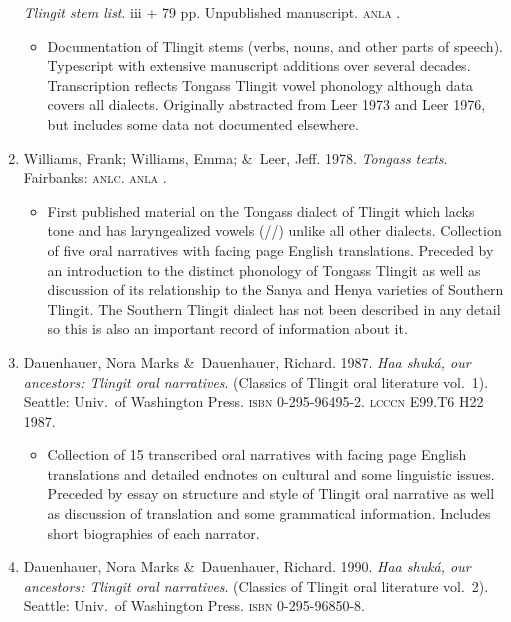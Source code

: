 \documentclass[12pt,letterpaper,oneside,article]{memoir}
\begin{document}
\begin{enumerate}
	\textit{Tlingit stem list}.
	iii + 79 pp.
	Unpublished manuscript.
	\textsc{anla} .
	\begin{itemize}
	\item	Documentation of Tlingit stems (verbs, nouns, and other parts of speech).
		Typescript with extensive manuscript additions over several decades.
		Transcription reflects Tongass Tlingit vowel phonology although data covers
		all dialects.
		Originally abstracted from Leer 1973 and Leer 1976, but includes some data
		not documented elsewhere.
	\end{itemize}
\item	Williams, Frank; Williams, Emma; \&\ Leer, Jeff.
	1978.
	\textit{Tongass texts}.
	Fairbanks: \textsc{anlc}.
	\textsc{anla} .
	\begin{itemize}
	\item	First published material on the Tongass dialect of Tlingit which lacks tone
		and has laryngealized vowels (//) unlike all other dialects.
		Collection of five oral narratives with facing page English translations.
		Preceded by an introduction to the distinct phonology of Tongass Tlingit as
		well as discussion of its relationship to the Sanya and Henya varieties of
		Southern Tlingit.
		The Southern Tlingit dialect has not been described in any detail so this is
		also an important record of information about it.
	\end{itemize}
\item	Dauenhauer, Nora Marks \&\ Dauenhauer, Richard.
	1987.
	\textit{Haa shuká, our ancestors: Tlingit oral narratives}.
	(Classics of Tlingit oral literature vol.\ 1).
	Seattle: Univ.\ of Washington Press.
	\textsc{isbn} 0-295-96495-2.
	\textsc{lcccn} E99.T6 H22 1987.
	\begin{itemize}
	\item	Collection of 15 transcribed oral narratives with facing page English
		translations and detailed endnotes on cultural and some linguistic issues.
		Preceded by essay on structure and style of Tlingit oral narrative as well
		as discussion of translation and some grammatical information.
		Includes short biographies of each narrator.
	\end{itemize}
\item	Dauenhauer, Nora Marks \&\ Dauenhauer, Richard.
	1990.
	\textit{Haa shuká, our ancestors: Tlingit oral narratives}.
	(Classics of Tlingit oral literature vol.\ 2).
	Seattle: Univ.\ of Washington Press.
	\textsc{isbn} 0-295-96850-8.

\end{enumerate}
\end{document}
